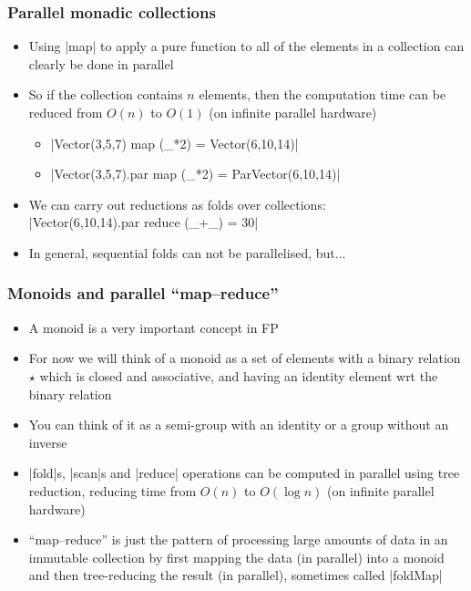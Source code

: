 \documentclass[mathserif,handout]{beamer}
\begin{document}
\begin{frame}[fragile]
  \frametitle{Parallel monadic collections}
  \begin{itemize}
  \item Using |map| to apply a \alert{pure} function to all of the elements in a collection can clearly be done in parallel
  \item So if the collection contains $n$ elements, then the computation time can be reduced from $O(n)$ to $O(1)$ (on infinite parallel hardware)
    \begin{itemize}
    \item |Vector(3,5,7) map (_*2) = Vector(6,10,14)|
    \item |Vector(3,5,7).par map (_*2) = ParVector(6,10,14)|
    \end{itemize}
    \item We can carry out \alert{reductions} as \alert{folds} over collections:\\
      |Vector(6,10,14).par reduce (_+_) = 30|
      \item In general, sequential folds can not be parallelised, but...
  \end{itemize}
\end{frame}

\begin{frame}[fragile]
  \frametitle{Monoids and parallel ``map--reduce''}
  \begin{itemize}
  \item A \alert{monoid} is a very important concept in FP
  \item For now we will think of a monoid as a \alert{set} of elements with a \alert{binary relation} $\star$ which is \alert{closed} and \alert{associative}, and having an \alert{identity} element wrt the binary relation
  \item You can think of it as a \alert{semi-group} with an identity or a \alert{group} without an inverse
  \item |fold|s, |scan|s and |reduce| operations can be computed in parallel using \alert{tree reduction}, reducing time from $O(n)$ to $O(\log n)$ (on infinite parallel hardware)
  \item ``\alert{map--reduce}'' is just the pattern of processing large amounts of data in an immutable collection by first \alert{map}ping the data (in parallel) into a monoid and then tree-\alert{reduc}ing the result (in parallel), sometimes called |foldMap|
  \end{itemize}
\end{frame}
\end{document}
